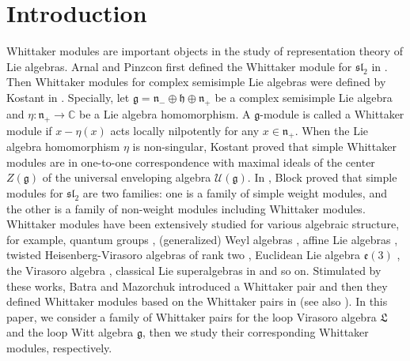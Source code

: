 \documentclass[12pt, a4paper]{amsart}
\newcommand{\C}{\mathbb{C}}
\newcommand{\U}{\mathcal{U}}
\theoremstyle{Theorem}
\theoremstyle{Theorem}
\numberwithin{equation}{section}
\begin{document}
\section{Introduction}
Whittaker modules are important objects in the study of
representation theory of Lie algebras. Arnal and Pinzcon first defined the Whittaker module
for $\mathfrak{sl}_{2}$ in \cite{AP}.
Then Whittaker modules for complex semisimple Lie algebras were defined by Kostant in \cite{Kos}. Specially,
let $\mathfrak{g}=\mathfrak{n}_{-}\oplus\mathfrak{h}\oplus\mathfrak{n}_{+}$ be a complex semisimple Lie algebra
and $\eta:\mathfrak{n}_{+}\rightarrow\C$ be a Lie algebra homomorphism.
A $\mathfrak{g}$-module is called a Whittaker module
if $x-\eta(x)$ acts locally nilpotently for any $x\in\mathfrak{n}_{+}$.
When the Lie algebra homomorphism $\eta$ is non-singular, Kostant proved that simple Whittaker modules
are in one-to-one correspondence with maximal ideals of the center $Z(\mathfrak{g})$ of
the universal enveloping algebra $\U(\mathfrak{g})$. In \cite{Blo}, Block proved that simple
modules for $\mathfrak{sl}_2$ are two families:
one is a family of simple weight modules,
and the other is a family of non-weight modules including Whittaker modules.
Whittaker modules have been extensively studied for various algebraic structure, for example,
quantum groups \cite{Ond,S}, (generalized) Weyl algebras \cite{BO},
affine Lie algebras \cite{ALZ,Chr,CGLW,CJ,GL,M}, twisted Heisenberg-Virasoro algebras of rank two \cite{TWX},
Euclidean Lie algebra $\mathfrak{e}(3)$ \cite{CSZ},
the Virasoro algebra \cite{FJK,LGZ,OW,Y}, classical Lie superalgebras in \cite{Che}
and so on. Stimulated by these works, Batra and Mazorchuk introduced a Whittaker pair and then they defined
Whittaker modules based on the Whittaker pairs in \cite{BM} (see also \cite{MZ2}).
In this paper, we consider a family of Whittaker pairs for the loop Virasoro algebra $\mathfrak{L}$
and the loop Witt algebra $\mathfrak{g}$, then we study their corresponding Whittaker modules, respectively.
\end{document}
